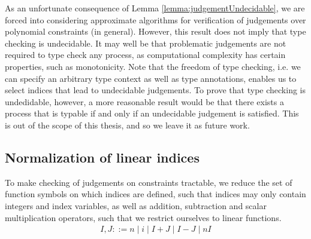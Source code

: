 As an unfortunate consequence of Lemma \ref{lemma:judgementUndecidable}, we are forced into considering approximate algorithms for verification of judgements over polynomial constraints (in general). However, this result does not imply that type checking is undecidable. It may well be that problematic judgements are not required to type check any process, as computational complexity has certain properties, such as monotonicity. Note that the freedom of type checking, i.e. we can specify an arbitrary type context as well as type annotations, enables us to select indices that lead to undecidable judgements. To prove that type checking is undedidable, however, a more reasonable result would be that there exists a process that is typable if and only if an undecidable judgement is satisfied. This is out of the scope of this thesis, and so we leave it as future work. %

\subsection{Normalization of linear indices}

To make checking of judgements on constraints tractable, we reduce the set of function symbols on which indices are defined, such that indices may only contain integers and index variables, as well as addition, subtraction and scalar multiplication operators, such that we restrict ourselves to linear functions.
\begin{align*}
        I,J ::= n \mid i \mid I + J \mid I - J \mid n I
    \end{align*}


